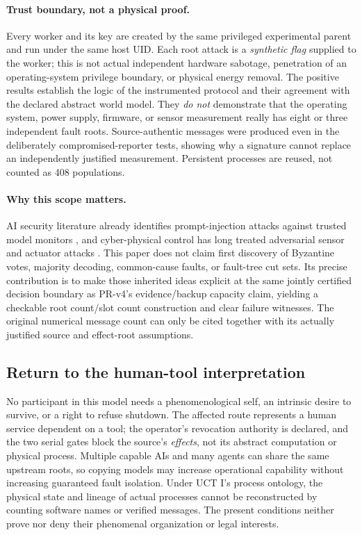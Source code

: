 \documentclass[11pt,a4paper]{article}
\theoremstyle{definition}\newtheorem{definition}{Definition}
\begin{document}
\paragraph{Trust boundary, not a physical proof.}
Every worker and its key are created by the same privileged experimental parent and run under the same host UID. Each root attack is a \emph{synthetic flag} supplied to the worker; this is not actual independent hardware sabotage, penetration of an operating-system privilege boundary, or physical energy removal. The positive results establish the logic of the instrumented protocol and their agreement with the declared abstract world model. They \emph{do not} demonstrate that the operating system, power supply, firmware, or sensor measurement really has eight or three independent fault roots. Source-authentic messages were produced even in the deliberately compromised-reporter tests, showing why a signature cannot replace an independently justified measurement. Persistent processes are reused, not counted as 408 populations.

\paragraph{Why this scope matters.}
AI security literature already identifies prompt-injection attacks against trusted model monitors \cite{terekhov,arike}, and cyber-physical control has long treated adversarial sensor and actuator attacks \cite{fawzi,andersson}. This paper does not claim first discovery of Byzantine votes, majority decoding, common-cause faults, or fault-tree cut sets. Its precise contribution is to make those inherited ideas explicit at the same jointly certified decision boundary as PR-v4's evidence/backup capacity claim, yielding a checkable root count/slot count construction and clear failure witnesses. The original numerical message count can only be cited together with its actually justified source and effect-root assumptions.

\subsection{Return to the human-tool interpretation}
No participant in this model needs a phenomenological self, an intrinsic desire to survive, or a right to refuse shutdown. The affected route represents a human service dependent on a tool; the operator's revocation authority is declared, and the two serial gates block the source's \emph{effects}, not its abstract computation or physical process. Multiple capable AIs and many agents can share the same upstream roots, so copying models may increase operational capability without increasing guaranteed fault isolation. Under UCT I's process ontology, the physical state and lineage of actual processes cannot be reconstructed by counting software names or verified messages. The present conditions neither prove nor deny their phenomenal organization or legal interests.
\end{document}

